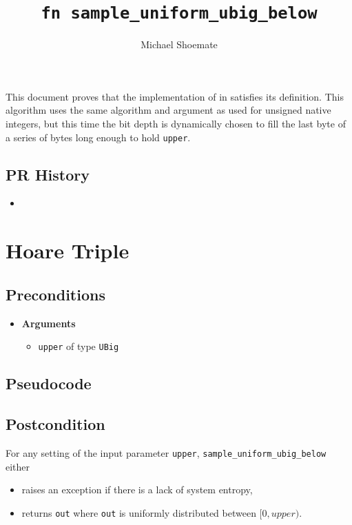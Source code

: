 \documentclass{article}
\title{\texttt{fn sample\_uniform\_ubig\_below}}
\author{Michael Shoemate}
\begin{document}
\maketitle

\contrib

This document proves that the implementation of  in 
satisfies its definition.
This algorithm uses the same algorithm and argument as used for unsigned native integers,
but this time the bit depth is dynamically chosen to fill the last byte of a series of bytes long enough to hold \texttt{upper}.

\subsection*{PR History}
\begin{itemize}
    \item {}
\end{itemize}

\section{Hoare Triple}
\subsection*{Preconditions}
\begin{itemize}
    \item \textbf{Arguments}
    \begin{itemize}
        \item \texttt{upper} of type \texttt{UBig}
    \end{itemize}
\end{itemize}

\subsection*{Pseudocode}



\subsection*{Postcondition}
For any setting of the input parameter \texttt{upper},
\texttt{sample\_uniform\_ubig\_below} either
\begin{itemize}
    \item raises an exception if there is a lack of system entropy,
    \item returns \texttt{out} where \texttt{out} is uniformly distributed between $[0, upper)$.
\end{itemize}
\end{document}

